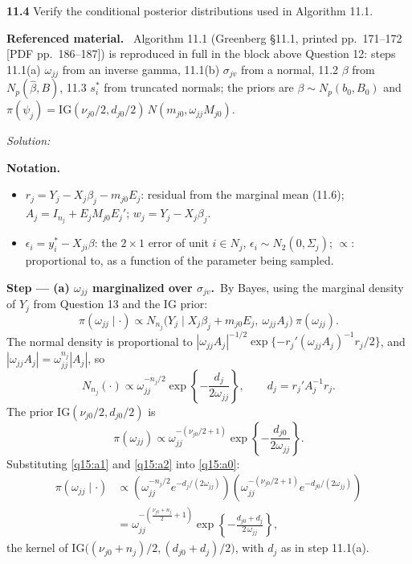 \documentclass[11pt,a4paper]{article}
\newif\ifsolucoes
\newcommand{\espacoresol}{4.5cm}   %
\newenvironment{refmaterial}{\par\smallskip\noindent\begingroup\small\textbf{Referenced material.}~}{\endgroup\par\smallskip}
\newenvironment{notacao}{\par\smallskip\noindent\textbf{Notation.}\begin{itemize}[leftmargin=1.4em,topsep=1pt,itemsep=0pt]\small}{\end{itemize}}
\newcommand{\resolespaco}{\ifsolucoes\else\par\textit{Solution:}\vspace{\espacoresol}\par\fi}
\newcommand{\passo}[2]{\par\smallskip\noindent\textbf{Step --- #1.}~#2}
\begin{document}
\noindent\textbf{11.4} Verify the conditional posterior distributions used in Algorithm 11.1.
\begin{refmaterial}
Algorithm 11.1 (Greenberg \S11.1, printed pp.~171--172 [PDF pp.~186--187]) is reproduced in full in the
block above Question 12: steps 11.1(a) $\omega_{jj}$ from an inverse gamma, 11.1(b) $\sigma_{jv}$ from a
normal, 11.2 $\beta$ from $N_p(\hat\beta,B)$, 11.3 $s_i^*$ from truncated normals; the priors are
$\beta\sim N_p(b_0,B_0)$ and $\pi(\psi_j)=\mathrm{IG}(\nu_{j0}/2,d_{j0}/2)\,N(m_{j0},\omega_{jj}M_{j0})$.
\end{refmaterial}
\resolespaco
\begin{sol}
\begin{notacao}
\item $r_j=Y_j-X_j\beta_j-m_{j0}E_j$: residual from the marginal mean (11.6); $A_j=I_{n_j}+E_jM_{j0}E_j'$;
$w_j=Y_j-X_j\beta_j$.
\item $\epsilon_i=y_i^*-X_{ji}\beta$: the $2\times1$ error of unit $i\in N_j$, $\epsilon_i\sim N_2(0,\Sigma_j)$;
$\propto$: proportional to, as a function of the parameter being sampled.
\end{notacao}

\passo{(a) $\omega_{jj}$ marginalized over $\sigma_{jv}$}{By Bayes, using the marginal density of $Y_j$ from
Question 13 and the IG prior:
\begin{equation}
\pi(\omega_{jj}\mid\cdot)\propto N_{n_j}\big(Y_j\mid X_j\beta_j+m_{j0}E_j,\ \omega_{jj}A_j\big)\ \pi(\omega_{jj}).\label{q15:a0}
\end{equation}
The normal density is proportional to $|\omega_{jj}A_j|^{-1/2}\exp\{-r_j'(\omega_{jj}A_j)^{-1}r_j/2\}$, and
$|\omega_{jj}A_j|=\omega_{jj}^{n_j}|A_j|$, so
\begin{equation}
N_{n_j}(\cdot)\propto\omega_{jj}^{-n_j/2}\exp\left\{-\frac{d_j}{2\omega_{jj}}\right\},\qquad d_j=r_j'A_j^{-1}r_j.\label{q15:a1}
\end{equation}
The prior $\mathrm{IG}(\nu_{j0}/2,d_{j0}/2)$ is
\begin{equation}
\pi(\omega_{jj})\propto\omega_{jj}^{-(\nu_{j0}/2+1)}\exp\left\{-\frac{d_{j0}}{2\omega_{jj}}\right\}.\label{q15:a2}
\end{equation}
Substituting \eqref{q15:a1} and \eqref{q15:a2} into \eqref{q15:a0}:
\begin{align}
\pi(\omega_{jj}\mid\cdot)&\propto\left(\omega_{jj}^{-n_j/2}e^{-d_j/(2\omega_{jj})}\right)\left(\omega_{jj}^{-(\nu_{j0}/2+1)}e^{-d_{j0}/(2\omega_{jj})}\right)\label{q15:a3}\\
&=\omega_{jj}^{-\left(\frac{\nu_{j0}+n_j}{2}+1\right)}\exp\left\{-\frac{d_{j0}+d_j}{2\,\omega_{jj}}\right\},\label{q15:a4}
\end{align}
the kernel of $\mathrm{IG}\big((\nu_{j0}+n_j)/2,(d_{j0}+d_j)/2\big)$, with $d_j$ as in step 11.1(a).}


\end{sol}
\end{document}
